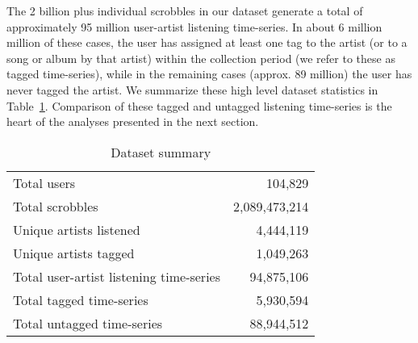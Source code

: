 The 2 billion plus individual scrobbles in our dataset generate a total of approximately 95 million user-artist listening time-series. In about 6 million million of these cases, the user has assigned at least one tag to the artist (or to a song or album by that artist) within the collection period (we refer to these as tagged time-series), while in the remaining cases (approx. 89 million) the user has never tagged the artist. We summarize these high level dataset statistics in Table~\ref{tab:data_summary}. Comparison of these tagged and untagged listening time-series is the heart of the analyses presented in the next section.

\begin{table}[t]
\vspace{-1em}
\begin{center}
\begin{tabular}{l|r}
\toprule
Total users & 104,829 \\
Total scrobbles & 2,089,473,214 \\
Unique artists listened & 4,444,119 \\
Unique artists tagged & 1,049,263 \\
\midrule
Total user-artist listening time-series & 94,875,106 \\
Total tagged time-series & 5,930,594 \\
Total untagged time-series & 88,944,512 \\
\bottomrule
\end{tabular}
\end{center}

\caption{Dataset summary}
\label{tab:data_summary}
\vspace{-3em}
\end{table}

